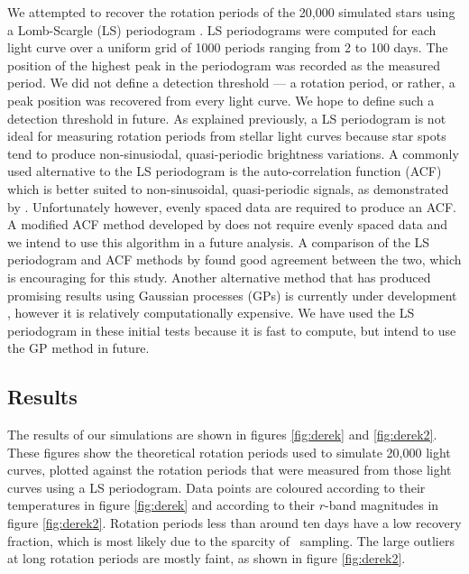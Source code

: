 We attempted to recover the rotation periods of the 20,000 simulated stars
using a Lomb-Scargle (LS) periodogram \citep[][]{Lomb1976, Scargle1982}.
LS periodograms were computed for each light curve over a uniform grid of 1000
periods ranging from 2 to 100 days.
The position of the highest peak in the periodogram was recorded as the
measured period.
We did not define a detection threshold --- a rotation period, or rather, a
peak position was recovered from every light curve.
We hope to define such a detection threshold in future.
As explained previously, a LS periodogram is not ideal for measuring rotation
periods from stellar light curves because star spots tend to produce
non-sinusiodal, quasi-periodic brightness variations.
A commonly used alternative to the LS periodogram is the auto-correlation
function (ACF) which is better suited to non-sinusoidal, quasi-periodic
signals, as demonstrated by \citet{Mcquillan2013}.
Unfortunately however, evenly spaced data are required to produce an ACF.
A modified ACF method developed by \citet{Edelson1998} does not require evenly
spaced data and we intend to use this algorithm in a future analysis.
A comparison of the LS periodogram and ACF methods by \citet{Aigrain2015b}
found good agreement between the two, which is encouraging for this study.
Another alternative method that has produced promising results using Gaussian
processes (GPs) is currently under development \citep{Angus2015b}, however it
is relatively computationally expensive.
We have used the LS periodogram in these initial tests because it is fast to
compute, but intend to use the GP method in future.

\subsection{Results}
\label{sec:LSST_results}

The results of our simulations are shown in figures \ref{fig:derek} and
\ref{fig:derek2}.
These figures show the theoretical rotation periods used to simulate 20,000
light curves, plotted against the rotation periods that were measured from
those light curves using a LS periodogram.
Data points are coloured according to their temperatures in figure
\ref{fig:derek} and according to their $r$-band magnitudes in figure
\ref{fig:derek2}.
Rotation periods less than around ten days have a low recovery fraction, which
is most likely due to the sparcity of \LSST\ sampling.
The large outliers at long rotation periods are mostly faint, as shown in
figure \ref{fig:derek2}.

